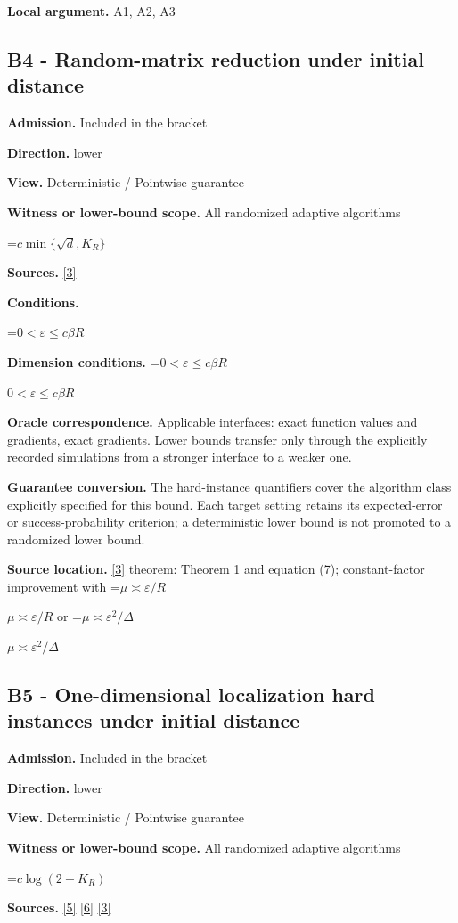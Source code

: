 \documentclass[10pt,a4paper]{article}
\newcommand{\AtlasMath}[1]{\par\begingroup\centering\setbox0=\hbox{$\displaystyle #1$}\ifdim\wd0>1.4\linewidth\typeout{ATLAS WIDE FORMULA: \the\wd0}\fi\ifdim\wd0>\linewidth\resizebox{\linewidth}{!}{\box0}\else\box0\fi\par\endgroup}
\newcommand{\AtlasInlineMath}[1]{\begingroup\setbox0=\hbox{$#1$}\ifdim\wd0>.4\linewidth\endgroup\AtlasMath{#1}\else\endgroup$#1$\fi}
\begin{document}
\textbf{Local argument.} A1, A2, A3

\subsection{B4 - Random-matrix reduction under initial distance}
\textbf{Admission.} Included in the bracket

\textbf{Direction.} lower

\textbf{View.} Deterministic / Pointwise guarantee

\textbf{Witness or lower-bound scope.} All randomized adaptive algorithms

\AtlasMath{c\min\{\sqrt d,K_R\}}
\textbf{Sources.} \href{https://arxiv.org/pdf/2609.10874}{[3]}

\textbf{Conditions.} 
\AtlasMath{0<\varepsilon\le c\beta R}


\textbf{Dimension conditions.} \AtlasInlineMath{0<\varepsilon\le c\beta R}

\textbf{Oracle correspondence.} Applicable interfaces: exact function values and gradients, exact gradients. Lower bounds transfer only through the explicitly recorded simulations from a stronger interface to a weaker one.

\textbf{Guarantee conversion.} The hard-instance quantifiers cover the algorithm class explicitly specified for this bound. Each target setting retains its expected-error or success-probability criterion; a deterministic lower bound is not promoted to a randomized lower bound.

\textbf{Source location.} \href{https://arxiv.org/pdf/2609.10874}{[3]} theorem: Theorem 1 and equation (7); constant-factor improvement with \AtlasInlineMath{\mu\asymp\varepsilon/R} or \AtlasInlineMath{\mu\asymp\varepsilon^2/\Delta}

\subsection{B5 - One-dimensional localization hard instances under initial distance}
\textbf{Admission.} Included in the bracket

\textbf{Direction.} lower

\textbf{View.} Deterministic / Pointwise guarantee

\textbf{Witness or lower-bound scope.} All randomized adaptive algorithms

\AtlasMath{c\log(2+K_R)}
\textbf{Sources.} \href{https://arxiv.org/pdf/2101.09740v2}{[5]} \href{https://arxiv.org/pdf/2609.33360v2}{[6]} \href{https://arxiv.org/pdf/2609.10874}{[3]}
\end{document}
